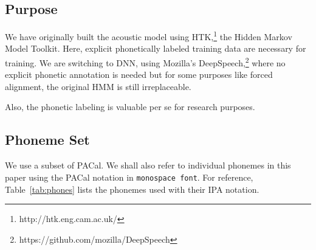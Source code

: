 \documentclass{itatnew}
\begin{document}
\subsection{Purpose}

We have originally built the acoustic model using
HTK,\footnote{http://htk.eng.cam.ac.uk/} the Hidden Markov Model Toolkit. Here,
explicit phonetically labeled training data are necessary for training. We are
switching to DNN, using Mozilla's
DeepSpeech,\footnote{https://github.com/mozilla/DeepSpeech} where no explicit
phonetic annotation is needed but for some purposes like forced alignment, the
original HMM is still irreplaceable.

Also, the phonetic labeling is valuable per se for research purposes.

\subsection{Phoneme Set}

We use a subset of PACal\cite{nouza1997phonetic}. We shall also refer to
individual phonemes in this paper using the PACal notation in \texttt{monospace
font}. For reference, Table~\ref{tab:phones} lists the phonemes used with their
IPA notation.
\end{document}
